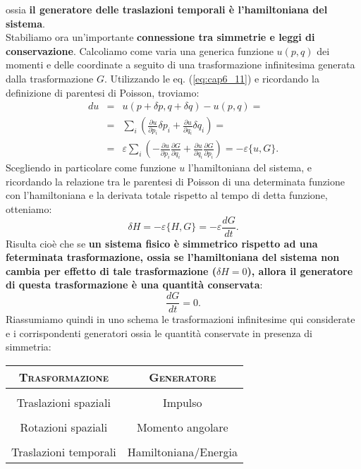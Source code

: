 ossia \textbf{il generatore delle traslazioni temporali è l'hamiltoniana del sistema}.\\
Stabiliamo ora un'importante \textbf{connessione tra simmetrie e leggi di conservazione}. Calcoliamo come varia una generica funzione $u(p,q)$ dei momenti e delle coordinate a seguito di una trasformazione infinitesima generata dalla trasformazione $G$. Utilizzando le eq. (\ref{eq:cap6_11}) e ricordando la definizione di parentesi di Poisson, troviamo:
\begin{eqnarray}
du & = & u(p+\delta p , q+\delta q )- u (p,q) = \nonumber \\
&=& \sum _i \left( \frac{\partial u}{\partial p_i} \delta p_i + \frac{\partial u}{\partial q_i } \delta q_i \right) = \nonumber \\
&=& \varepsilon \sum _i \left( -\frac{\partial u}{\partial p_i} \frac{\partial G}{\partial q_i} + \frac{\partial u}{\partial q_i } \frac{\partial G}{\partial p_i} \right) =-\varepsilon \{ u, G \} .
\end{eqnarray}
Scegliendo in particolare come funzione $u$ l'hamiltoniana del sistema,  e ricordando la relazione tra le parentesi di Poisson di una determinata funzione con l'hamiltoniana e la derivata totale rispetto al tempo di detta funzione, otteniamo:
\begin{equation}
\delta H = -\varepsilon \{H,G\} = -\varepsilon \frac{dG}{dt}.
\end{equation}
Risulta cioè che se \textbf{un sistema fisico è simmetrico rispetto ad una feterminata trasformazione, ossia se l'hamiltoniana del sistema non cambia per effetto di tale trasformazione ($\delta H =0$), allora il generatore di questa trasformazione è una quantità conservata}:
\begin{equation}
\frac{dG}{dt}=0.
\end{equation}
Riassumiamo quindi in uno schema le trasformazioni infinitesime qui considerate e i corrispondenti generatori ossia le quantità conservate in presenza di simmetria:

\begin{table}[!htbp]
\begin{center}
\begin{tabular}{c|c}
\textbf{\textsc{Trasformazione}} & \textbf{\textsc{Generatore}}\\
\hline \\
Traslazioni spaziali & Impulso \\
\hline \\
Rotazioni spaziali & Momento angolare \\
\hline \\
Traslazioni temporali &  Hamiltoniana/Energia \\
\hline 
\end{tabular}
\end{center}
\end{table} 
